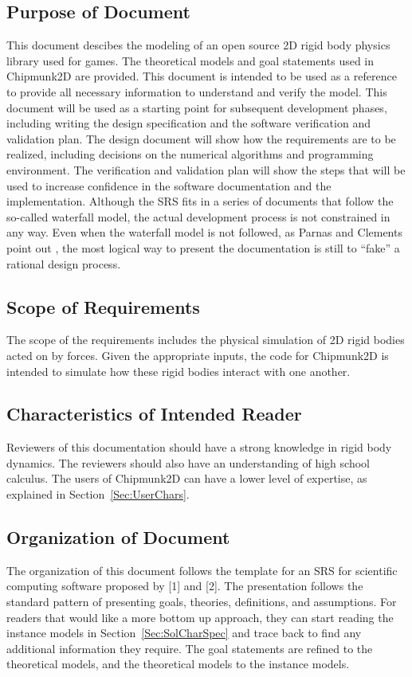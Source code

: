 \documentclass[12pt]{article}
\begin{document}
\subsection{Purpose of Document}
\label{Sec:DocPurpose}
This document descibes the modeling of an open source 2D rigid body physics library used for games. The theoretical models and goal statements used in Chipmunk2D are provided. This document is intended to be used as a reference to provide all necessary information to understand and verify the model.
This document will be used as a starting point for subsequent development phases, including writing the design specification and the software verification and validation plan. The design document will show how the requirements are to be realized, including decisions on the numerical algorithms and programming environment. The verification and validation plan will show the steps that will be used to increase confidence in the software documentation and the implementation. Although the SRS fits in a series of documents that follow the so-called waterfall model, the actual development process is not constrained in any way. Even when the waterfall model is not followed, as Parnas and Clements point out \cite{parnasClements1986}, the most logical way to present the documentation is still to ``fake'' a rational design process.
\subsection{Scope of Requirements}
\label{Sec:ReqsScope}
The scope of the requirements includes the physical simulation of 2D rigid bodies acted on by forces. Given the appropriate inputs, the code for Chipmunk2D is intended to simulate how these rigid bodies interact with one another.
\subsection{Characteristics of Intended Reader}
\label{Sec:ReaderChars}
Reviewers of this documentation should have a strong knowledge in rigid body dynamics. The reviewers should also have an understanding of high school calculus. The users of Chipmunk2D can have a lower level of expertise, as explained in Section~\ref{Sec:UserChars}.
\subsection{Organization of Document}
\label{Sec:DocOrg}
The organization of this document follows the template for an SRS for scientific computing software proposed by {[}1{]} and {[}2{]}. The presentation follows the standard pattern of presenting goals, theories, definitions, and assumptions. For readers that would like a more bottom up approach, they can start reading the instance models in Section~\ref{Sec:SolCharSpec} and trace back to find any additional information they require.
The goal statements are refined to the theoretical models, and the theoretical models to the instance models.
\end{document}
